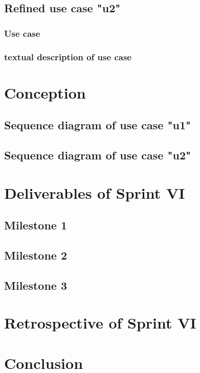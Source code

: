 \subsection{Refined use case "u2"}
\subsubsection{Use case}
\subsubsection{textual description of use case}

\section{Conception}
\subsection{Sequence diagram of use case "u1"}
\subsection{Sequence diagram of use case "u2"}

\section{Deliverables of Sprint VI}
\subsection{Milestone 1}
\subsection{Milestone 2}
\subsection{Milestone 3}
\section{Retrospective of Sprint VI}
\section{Conclusion}


